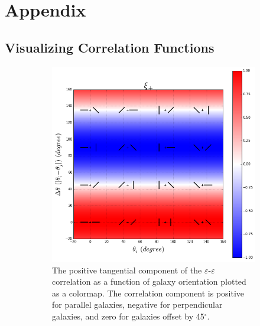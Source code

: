 \documentclass[%
 reprint,
 amsmath,amssymb,
 aps,nofootinbib
]{revtex4-1}
\begin{document}
\section{Appendix}

\subsection{Visualizing Correlation Functions} \label{visualize_corr}

\begin{figure}[!b]
    \centering
    \begin{subfigure}{0.425\textwidth}
        \includegraphics[width=\textwidth]{figs-swe/xip_colormap.png}
        \captionsetup{justification=raggedright,singlelinecheck=false}
        \caption{The positive tangential component of the $\varepsilon$-$\varepsilon$ correlation as a function of galaxy orientation plotted as a colormap. The correlation component is positive for parallel galaxies, negative for perpendicular galaxies, and zero for galaxies offset by 45$^\circ$.}
        \label{xip_colormap}
    \end{subfigure}
    ~
    \begin{subfigure}{0.425\textwidth}

\end{subfigure}
\end{figure}
\end{document}
